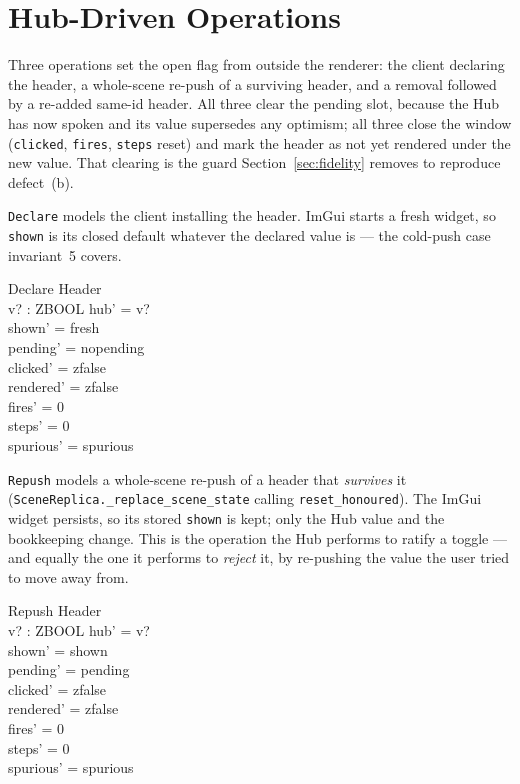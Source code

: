 \documentclass[a4paper,10pt,fleqn]{article}
\begin{document}
\section{Hub-Driven Operations}

Three operations set the open flag from outside the renderer: the client
declaring the header, a whole-scene re-push of a surviving header, and a
removal followed by a re-added same-id header.  All three clear the pending
slot, because the Hub has now spoken and its value supersedes any optimism;
all three close the window (\texttt{clicked}, \texttt{fires}, \texttt{steps}
reset) and mark the header as not yet rendered under the new value.  That
clearing is the guard Section~\ref{sec:fidelity} removes to reproduce
defect~(b).

\texttt{Declare} models the client installing the header.  ImGui starts a fresh
widget, so \texttt{shown} is its closed default whatever the declared value is
--- the cold-push case invariant~5 covers.

\begin{schema}{Declare}
  \Delta Header \\
  v? : ZBOOL
\where
  hub' = v? \\
  shown' = fresh \\
  pending' = nopending \\
  clicked' = zfalse \\
  rendered' = zfalse \\
  fires' = 0 \\
  steps' = 0 \\
  spurious' = spurious
\end{schema}

\texttt{Repush} models a whole-scene re-push of a header that \emph{survives}
it (\texttt{SceneReplica.\_replace\_scene\_state} calling
\texttt{reset\_honoured}).  The ImGui widget persists, so its stored
\texttt{shown} is kept; only the Hub value and the bookkeeping change.  This is
the operation the Hub performs to ratify a toggle --- and equally the one it
performs to \emph{reject} it, by re-pushing the value the user tried to move
away from.

\begin{schema}{Repush}
  \Delta Header \\
  v? : ZBOOL
\where
  hub' = v? \\
  shown' = shown \\
  pending' = pending \\
  clicked' = zfalse \\
  rendered' = zfalse \\
  fires' = 0 \\
  steps' = 0 \\
  spurious' = spurious
\end{schema}
\end{document}
